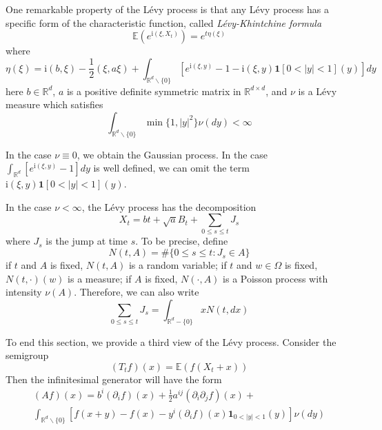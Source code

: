 \documentclass[10pt,a4paper]{article}
\newcommand{\ii}[0]{\mathrm{i}}
\newcommand{\RR}[0]{\mathbb{R}}
\theoremstyle{definition}
\begin{document}
One remarkable property of the L\'evy process is that any L\'evy process has a specific form of the characteristic function, called \textit{L\'evy-Khintchine formula}
\begin{equation}
	\mathbb{E}(e^{\ii (\xi, X_t)}) = e^{t\eta(\xi)}
\end{equation}
where
\begin{equation}\label{equ:eta}
	\eta(\xi) = \ii (b, \xi) - \frac{1}{2}(\xi, a\xi) + \int_{\RR^d\backslash \{0\}} \left[ e^{\ii (\xi, y)}-1-\ii (\xi, y)\mathbf{1}[0<|y|<1](y) \right]dy
\end{equation}
here $b\in \RR^d$, $a$ is a positive definite symmetric matrix in $\RR^{d\times d}$, and $\nu$ is a L\'evy measure which satisfies
\begin{equation}
	\int_{\RR^d\backslash \{0\}} \min\{1, |y|^2\}\nu(dy)<\infty
\end{equation}

In the case $\nu\equiv 0$, we obtain the Gaussian process. In the case $\int_{\RR^d} \left[ e^{\ii (\xi, y)}-1\right]dy$ is well defined, we can omit the term $\ii (\xi, y)\mathbf{1}[0<|y|<1](y)$. 

In the case $\nu<\infty$, the L\'evy process has the decomposition
\begin{equation}
	X_t = bt + \sqrt{a}B_t + \sum_{0\leq s\leq t} J_s 
\end{equation}
where $J_s$ is the jump at time $s$. To be precise, define 
\begin{equation}
	N(t, A) = \#\{0\leq s\leq t: J_s\in A\}
\end{equation}
if $t$ and $A$ is fixed, $N(t, A)$ is a random variable; if $t$ and $w\in \Omega$ is fixed, $N(t, \cdot)(w)$ is a measure; if $A$ is fixed, $N(\cdot, A)$ is a Poisson process with intensity $\nu(A)$. Therefore, we can also write
\begin{equation}
	\sum_{0\leq s\leq t} J_s = \int_{\RR^d-\{0\}} xN(t, dx)
\end{equation}

To end this section, we provide a third view of the L\'evy process. Consider the semigroup 
\begin{equation}
	(T_tf)(x) = \mathbb{E}(f(X_t+x))
\end{equation}
Then the infinitesimal generator will have the form
\begin{multline}\label{equ:Af}
	(Af)(x) =  b^i(\partial_i f)(x) + \frac{1}{2}a^{ij}(\partial_i \partial_j f)(x) +\\
	\int_{\RR^d\backslash\{0\}} [f(x+y)-f(x)-y^i(\partial_i f)(x) \mathbf{1}_{0<|y|<1}(y)]\nu(dy)
\end{multline}
\end{document}
